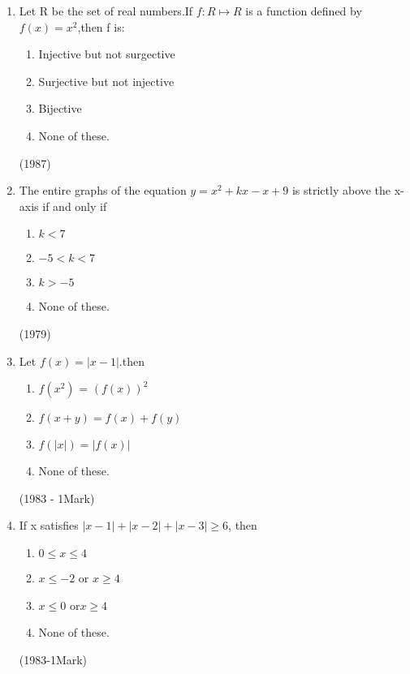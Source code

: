 \documentclass[journal,12pt,twocolumn]{IEEEtran}
\theoremstyle{remark}
\begin{document}
\begin{enumerate}
     


\item Let R be the set of real numbers.If $f:R \mapsto R $ is
a function defined by$f(x)= x^2 $,then f is:

\begin{enumerate}
    
\item Injective but not surgective 
 
\item Surjective but not injective
 
\item Bijective
 
\item None of these.
\end{enumerate}


\hfill
(1987)


 


\item The entire graphs of the equation $y= x{^2}+ kx - x +9$ is strictly above the x-axis 
if and only if
\begin{enumerate}
    


 \item $k<7$
 
 \item $-5<k<7$
 
 \item $k>-5$
 
 \item None of these.
 \end{enumerate}
 \hfill
 (1979)


\item Let $f(x)=|x-1|.$then

\begin{enumerate}
  \item $f(x^2)$ = $(f(x))^2$

  \item  $f(x+y)=f(x)+f(y)$

  \item $f(|x|)=|f(x)|$

  \item None of these.
  \end{enumerate}
  
  \hfill
  (1983 - 1Mark)




  \item If x satisfies $|x-1| + |x-2| + |x-3|\geq6$, then

\begin{enumerate}
    

  \item $0\leq x\leq4$
  
  \item $x \leq-2$ or $x\geq4$
  
  \item $x\leq0$ or$x\geq4$
  
  \item None of these.

  \end{enumerate}
  \hfill
  (1983-1Mark)



  

\end{enumerate}
\end{document}
